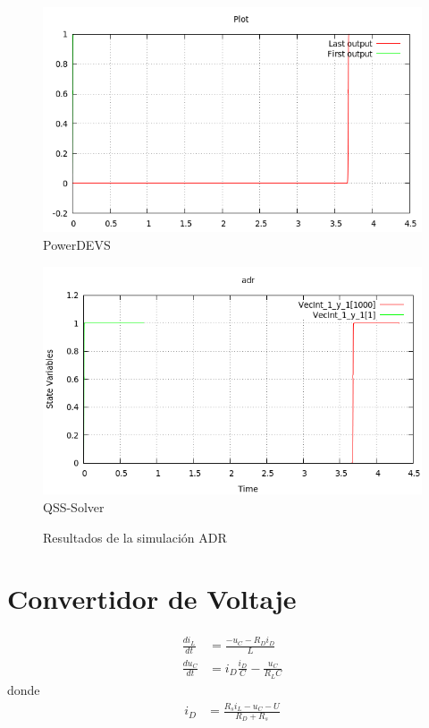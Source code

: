 \documentclass{beamer}
\begin{document}
\begin{frame}
\begin{figure}[H]
\begin{minipage}{0.5\textwidth}
 \includegraphics[width=\linewidth]{adr-pd}
\centering
PowerDEVS
\end{minipage}\hfill
\begin{minipage}{0.5\textwidth}
 \includegraphics[width=\linewidth]{adr-qss}
\centering
QSS-Solver
\end{minipage}
\caption{Resultados de la simulación ADR}\label{graph:adr}
\end{figure}
\end{frame}


\section{Convertidor de Voltaje}
\begin{frame}
\begin{align*}
\frac{di_{L}}{dt} & = \frac{-u_{C} - R_D i_D }{L}\\
\frac{du_C}{dt} & =i_D \frac{i_D}{C} - \frac{u_C}{R_L C }
\end{align*}
donde
\begin{align*}
i_D & = \frac{R_s i_L - u_C - U }{R_D + R_s}
\end{align*}
\end{frame}
\end{document}
